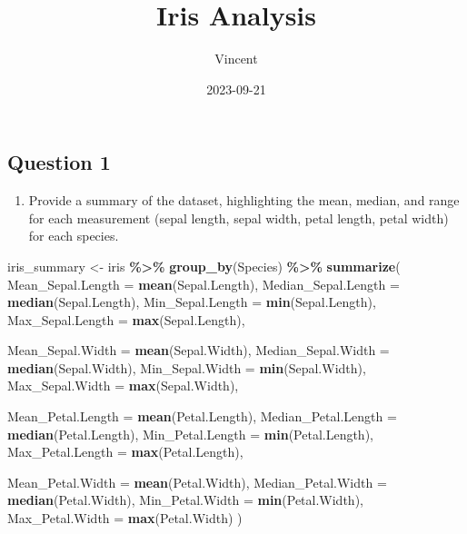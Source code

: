 \documentclass[
]{article}
\title{Iris Analysis}
\author{Vincent}
\date{2023-09-21}
\newenvironment{Shaded}{\begin{snugshade}}{\end{snugshade}}
\newcommand{\AttributeTok}[1]{\textcolor[rgb]{0.13,0.29,0.53}{#1}}
\newcommand{\FunctionTok}[1]{\textcolor[rgb]{0.13,0.29,0.53}{\textbf{#1}}}
\newcommand{\NormalTok}[1]{#1}
\newcommand{\OtherTok}[1]{\textcolor[rgb]{0.56,0.35,0.01}{#1}}
\newcommand{\SpecialCharTok}[1]{\textcolor[rgb]{0.81,0.36,0.00}{\textbf{#1}}}
\providecommand{\tightlist}{%
  \setlength{\itemsep}{0pt}\setlength{\parskip}{0pt}}
\begin{document}
\maketitle

\hypertarget{question-1}{%
\subsection{Question 1}\label{question-1}}

\begin{enumerate}
\def\labelenumi{\arabic{enumi}.}
\tightlist
\item
  Provide a summary of the dataset, highlighting the mean, median, and
  range for each measurement (sepal length, sepal width, petal length,
  petal width) for each species.
\end{enumerate}

\begin{Shaded}
\begin{Highlighting}[]
\NormalTok{iris\_summary }\OtherTok{\textless{}{-}}\NormalTok{ iris }\SpecialCharTok{\%\textgreater{}\%}
  \FunctionTok{group\_by}\NormalTok{(Species) }\SpecialCharTok{\%\textgreater{}\%}
  \FunctionTok{summarize}\NormalTok{(}
    \AttributeTok{Mean\_Sepal.Length =} \FunctionTok{mean}\NormalTok{(Sepal.Length),}
    \AttributeTok{Median\_Sepal.Length =} \FunctionTok{median}\NormalTok{(Sepal.Length),}
    \AttributeTok{Min\_Sepal.Length =} \FunctionTok{min}\NormalTok{(Sepal.Length),}
    \AttributeTok{Max\_Sepal.Length =} \FunctionTok{max}\NormalTok{(Sepal.Length),}
    
    \AttributeTok{Mean\_Sepal.Width =} \FunctionTok{mean}\NormalTok{(Sepal.Width),}
    \AttributeTok{Median\_Sepal.Width =} \FunctionTok{median}\NormalTok{(Sepal.Width),}
    \AttributeTok{Min\_Sepal.Width =} \FunctionTok{min}\NormalTok{(Sepal.Width),}
    \AttributeTok{Max\_Sepal.Width =} \FunctionTok{max}\NormalTok{(Sepal.Width),}
    
    \AttributeTok{Mean\_Petal.Length =} \FunctionTok{mean}\NormalTok{(Petal.Length),}
    \AttributeTok{Median\_Petal.Length =} \FunctionTok{median}\NormalTok{(Petal.Length),}
    \AttributeTok{Min\_Petal.Length =} \FunctionTok{min}\NormalTok{(Petal.Length),}
    \AttributeTok{Max\_Petal.Length =} \FunctionTok{max}\NormalTok{(Petal.Length),}
    
    \AttributeTok{Mean\_Petal.Width =} \FunctionTok{mean}\NormalTok{(Petal.Width),}
    \AttributeTok{Median\_Petal.Width =} \FunctionTok{median}\NormalTok{(Petal.Width),}
    \AttributeTok{Min\_Petal.Width =} \FunctionTok{min}\NormalTok{(Petal.Width),}
    \AttributeTok{Max\_Petal.Width =} \FunctionTok{max}\NormalTok{(Petal.Width)}
\NormalTok{  )}
\end{Highlighting}
\end{Shaded}
\end{document}
